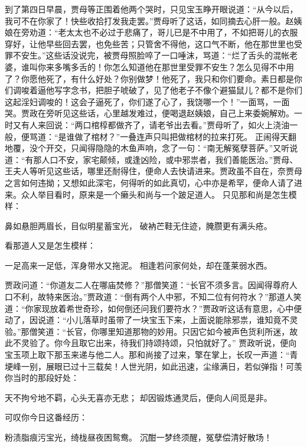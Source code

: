 \documentclass[12pt,oneside]{book}
\begin{document}
到了第四日早晨，贾母等正围着他两个哭时，只见宝玉睁开眼说道：“从今以后，我可不在你家了！快些收拾打发我走罢。”贾母听了这话，如同摘去心肝一般。赵姨娘在旁劝道：“老太太也不必过于悲痛了，哥儿已是不中用了，不如把哥儿的衣服穿好，让他早些回去罢，也免些苦；只管舍不得他，这口气不断，他在那世里也受罪不安生。”这些话没说完，被贾母照脸啐了一口唾沫，骂道：“烂了舌头的混帐老婆，谁叫你来多嘴多舌的！你怎么知道他在那世里受罪不安生？怎么见得不中用了？你愿他死了，有什么好处？你别做梦！他死了，我只和你们要命。素日都是你们调唆着逼他写字念书，把胆子唬破了，见了他老子不像个避猫鼠儿？都不是你们这起淫妇调唆的！这会子逼死了，你们遂了心了，我饶哪一个！”一面骂，一面哭。贾政在旁听见这些话，心里越发难过，便喝退赵姨娘，自己上来委婉解劝。一时又有人来回说：“两口棺椁都做齐了，请老爷出去看。”贾母听了，如火上浇油一般，便骂道：“是谁做了棺材？”一叠连声只叫把做棺材的拉来打死。
正闹得天翻地覆，没个开交，只闻得隐隐的木鱼声响，念了一句：“南无解冤孽菩萨。”又听说道：“有那人口不安，家宅颠倾，或逢凶险，或中邪祟者，我们善能医治。”贾母、王夫人等听见这些话，哪里还耐得住，便命人去快请进来。贾政虽不自在，奈贾母之言如何违拗；又想如此深宅，何得听的如此真切，心中亦是希罕，便命人请了进来。众人举目看时，原来是一个癞头和尚与一个跛足道人。
只见那和尚是怎生模样：

鼻如悬胆两眉长，目似明星蓄宝光，
破衲芒鞋无住迹，腌臜更有满头疮。

看那道人又是怎生模样：

一足高来一足低，浑身带水又拖泥。
相逢若问家何处，却在蓬莱弱水西。

贾政问道：“你道友二人在哪庙焚修？”那僧笑道：“长官不须多言。因闻得尊府人口不利，故特来医治。”贾政道：“倒有两个人中邪，不知二位有何符水？”那道人笑道：“你家现放着希世奇珍，如何倒还问我们要符水？”贾政听这话有意思，心中便动了，因说道：“小儿落草时虽带了一块宝玉下来，上面说能除邪祟，谁知竟不灵验。”那僧笑道：“长官，你哪里知道那物的妙用。只因它如今被声色货利所迷，故此不灵验了。你今且取它出来，待我们持颂持颂，只怕就好了。”
贾政听说，便向宝玉项上取下那玉来递与他二人。那和尚接了过来，擎在掌上，长叹一声道：“青埂峰一别，展眼已过十三载矣！人世光阴，如此迅速，尘缘满日，若似弹指！可羡你当时的那段好处：

天不拘兮地不羁，心头无喜亦无悲；
却因锻炼通灵后，便向人间觅是非。

可叹你今日这番经历：

粉渍脂痕污宝光，绮栊昼夜困鸳鸯。
沉酣一梦终须醒，冤孽偿清好散场！
\end{document}

